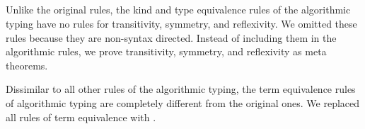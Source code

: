 \begin{figure}
    \begin{center}
        \andalso
         \hfil
         \\[2mm]
         \\[2mm]
         \andalso
         \\[2mm]
         \\[2mm]
         \hfil
    \end{center}
    \label{fig:algorithmic-typing-rules}
\end{figure}




Unlike the original rules, the kind and type equivalence rules of the
algorithmic typing have no rules for transitivity, symmetry, and reflexivity.
We omitted these rules because they are non-syntax directed. Instead of
including them in the algorithmic rules, we prove transitivity, symmetry, and
reflexivity as meta theorems.


Dissimilar to all other rules of the algorithmic typing, the term equivalence
rules of algorithmic typing are completely different from the original ones. We
replaced all rules of term equivalence with \QAANF.

